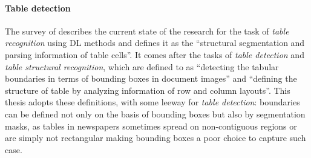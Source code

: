 \paragraph{Table detection}
The survey of \citet{hashmi_current_2021} describes the current state of the research for the task of \textit{table recognition} using DL methods and defines it as the ``structural segmentation and parsing information of table cells''. It comes after the tasks of \textit{table detection} and \textit{table structural recognition}, which are defined to as ``detecting the tabular boundaries in terms of bounding boxes in document images'' and ``defining the structure of table by analyzing information of row and column layouts''. This thesis adopts these definitions, with some leeway for \textit{table detection}: boundaries can be defined not only on the basis of bounding boxes but also by segmentation masks, as tables in newspapers sometimes spread on non-contiguous regions or are simply not rectangular making bounding boxes a poor choice to capture such case. \\
